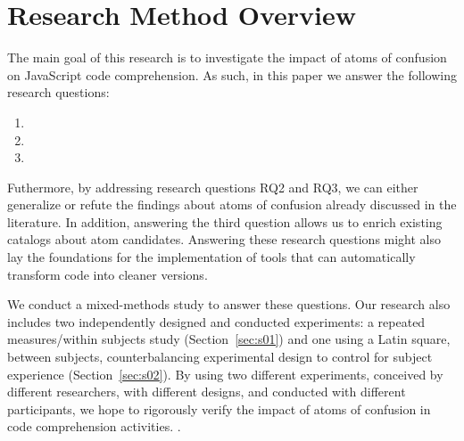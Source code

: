 \section{Research Method Overview}
\label{method}

The main goal of this research is to investigate the impact of atoms of confusion on JavaScript code comprehension. As such, in this paper we answer the following research questions: 

\begin{enumerate}[(RQ1)]
\item \revised{\rqd}
\item \rqa 
\item \rqb
\end{enumerate}

Futhermore, by addressing research questions RQ2 and RQ3, we can either generalize or refute the findings about atoms of confusion already discussed in the literature. 
In addition, answering the third question allows us to enrich existing catalogs about atom candidates. Answering these research questions might also lay the foundations for the implementation of tools that can automatically transform code into cleaner versions.

We conduct a mixed-methods study to answer these questions.
Our research also includes two independently designed and conducted experiments: a repeated measures/within subjects study (Section~\ref{sec:s01}) and one using a Latin square, between subjects, counterbalancing experimental design to control for subject experience (Section~\ref{sec:s02}). By using two different experiments, conceived by different researchers, with different designs, and conducted with different participants, we hope to rigorously verify the impact of atoms of confusion in code comprehension activities. .



